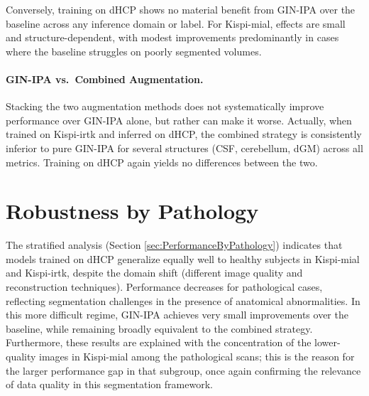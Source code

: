 Conversely, training on dHCP shows no material benefit from GIN-IPA over the baseline across any inference domain or label. For Kispi-mial, effects are small and structure-dependent, with modest improvements predominantly in cases where the baseline struggles on poorly segmented volumes.

\paragraph{GIN-IPA vs.\ Combined Augmentation.}
Stacking the two augmentation methods does not systematically improve performance over GIN-IPA alone, but rather can make it worse. Actually, when trained on Kispi-irtk and inferred on dHCP, the combined strategy is consistently inferior to pure GIN-IPA for several structures (CSF, cerebellum, dGM) across all metrics. Training on dHCP again yields no differences between the two.

\section{Robustness by Pathology}
The stratified analysis (Section \ref{sec:PerformanceByPathology}) indicates that models trained on dHCP generalize equally well to healthy subjects in Kispi-mial and Kispi-irtk, despite the domain shift (different image quality and reconstruction techniques). Performance decreases for pathological cases, reflecting segmentation challenges in the presence of anatomical abnormalities. In this more difficult regime, GIN-IPA achieves very small improvements over the baseline, while remaining broadly equivalent to the combined strategy. Furthermore, these results are explained with the concentration of the lower-quality images in Kispi-mial among the pathological scans; this is the reason for the larger performance gap in that subgroup, once again confirming the relevance of data quality in this segmentation framework.

